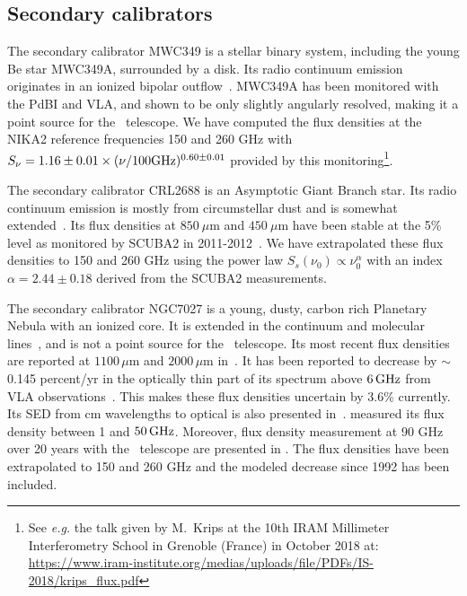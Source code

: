 \subsection{Secondary calibrators}
\label{se:ref_flux_secondaries}


The secondary calibrator MWC349 is a stellar
binary system, including the young Be star MWC349A, surrounded by a
disk. Its radio continuum emission
originates in an ionized bipolar outflow~\citep{Tafoya2004}. MWC349A has
been monitored with the PdBI and VLA, and
shown to be %
only slightly angularly resolved,
making it a point source for the \trentemetre\ telescope.
We have computed the flux densities at the NIKA2 reference frequencies 150 and
260 GHz with $S_\nu = 1.16\pm0.01 \times
(\nu/100 \rm{GHz})^{0.60\pm0.01}$ provided by this
monitoring\footnote{See \emph{e.g.} the talk given by M.~Krips at the 10th 
IRAM Millimeter Interferometry School in Grenoble (France) in October
2018 at: 
\url{https://www.iram-institute.org/medias/uploads/file/PDFs/IS-2018/krips_flux.pdf}}.


The secondary calibrator CRL2688 is an Asymptotic Giant Branch
star. Its radio continuum emission is mostly from circumstellar dust
and is somewhat extended~\citep{Knapp1994}.  Its flux densities at
$850\ \mu$m and $450 \ \mu$m have been stable at the 5\% level as
monitored by SCUBA2 in 2011-2012~\citep{Dempsey2013_SCUBA2}.
We have extrapolated these flux densities to 150 and 260 GHz
using the power law $S_s(\nu_0) \propto \nu_0^{\alpha}$ with an index
$\alpha=2.44\pm0.18$ derived from the SCUBA2 measurements.


The secondary calibrator NGC7027 is a young, dusty, carbon rich
Planetary Nebula with an ionized core.  It is extended in the
continuum and molecular lines~\citep{Bieging1991}, and is not a point
source for the \trentemetre\ telescope.  Its most recent flux densities are
reported at $1100\, \mu$m and $2000\, \mu$m in~\citet{Hoare1992}. It has
been reported to decrease by $\sim$ 0.145 percent/yr in the optically
thin part of its spectrum above $6\,\rm{GHz}$ from VLA
observations~\citep{Zijlstra2008, Hafez2008}. This makes
these flux densities uncertain by 3.6\% currently. Its SED from cm
wavelengths to optical is also presented in~\citet{Hafez2008}. {\lp
\citet{Perley2013} measured its flux density between 1 and $50\,
\rm{GHz}$. Moreover, flux density measurement at 90 GHz over 20 years
with the \trentemetre\ telescope are presented in \citet{Kramer2008}.}
The flux densities have been extrapolated to 150 and 260 GHz and the
modeled decrease since 1992 has been included.

